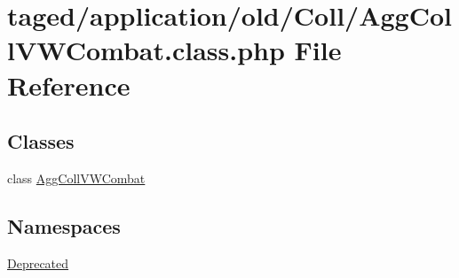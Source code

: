 \hypertarget{_agg_coll_v_w_combat_8class_8php}{}\section{taged/application/old/\+Coll/\+Agg\+Coll\+V\+W\+Combat.class.\+php File Reference}
\label{_agg_coll_v_w_combat_8class_8php}
\subsection*{Classes}
\begin{DoxyCompactItemize}
\item 
class \hyperlink{class_agg_coll_v_w_combat}{Agg\+Coll\+V\+W\+Combat}
\end{DoxyCompactItemize}
\subsection*{Namespaces}
\begin{DoxyCompactItemize}
\item 
 \hyperlink{namespace_deprecated}{Deprecated}
\end{DoxyCompactItemize}
